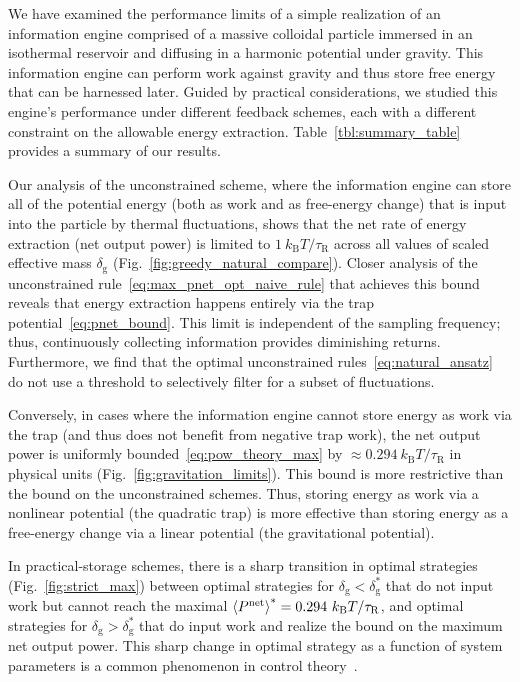 \documentclass[%
reprint,
bibnotes, amsmath, amssymb, aps, pre,
 showkeys,
floatfix
]{revtex4-2}
\newcommand{\kT}{k_{\mathrm{B}}T}
\newcommand{\mrm}{\mathrm}
\newcommand{\trelo}{\tau_{\mrm{R}}}
\newcommand{\dg}{\delta_{\mrm{g}}}
\newcommand{\epn}{\ev{P^{\mrm{net}}}}
\begin{document}
We have examined the performance limits of a simple realization of an information engine comprised of a massive colloidal particle immersed in an isothermal reservoir and diffusing in a harmonic potential under gravity. 
This information engine can perform work against gravity and thus store free energy that can be harnessed later.
Guided by practical considerations, we studied this engine's performance under different feedback schemes, each with a different constraint on the allowable energy extraction. 
Table~\ref{tbl:summary_table} provides a summary of our results.

Our analysis of the unconstrained scheme, where the information engine can store all of the potential energy (both as work and as free-energy change) that is input into the particle by thermal fluctuations, shows that the net rate of energy extraction (net output power) is limited to $1\ \kT/\trelo$ across all values of scaled effective mass $\dg$ (Fig.~\ref{fig:greedy_natural_compare}). 
Closer analysis of the unconstrained rule~\eqref{eq:max_pnet_opt_naive_rule} that achieves this bound reveals that energy extraction happens entirely via the trap potential~\eqref{eq:pnet_bound}. 
This limit is independent of the sampling frequency; thus, continuously collecting information provides diminishing returns.
Furthermore, we find that the optimal unconstrained rules~\eqref{eq:natural_ansatz} do not use a threshold to selectively filter for a subset of fluctuations.

Conversely, in cases where the information engine cannot store energy as work via the trap (and thus does not benefit from negative trap work), the net output power is uniformly bounded~\eqref{eq:pow_theory_max} by $\approx 0.294\ \kT/\trelo$ in physical units (Fig.~\ref{fig:gravitation_limits}).
This bound is more restrictive than the bound on the unconstrained schemes. 
Thus, storing energy as work via a nonlinear potential (the quadratic trap) is more effective than storing energy as a free-energy change via a linear potential (the gravitational potential).

In practical-storage schemes, there is a sharp transition in optimal strategies (Fig.~\ref{fig:strict_max}) between optimal strategies for $\dg < \dg^{*}$ that do not input work but cannot reach the maximal $\epn^{*} = 0.294\ \kT/\trelo$, and optimal strategies for $\dg > \dg^{*}$ that do input work and realize the bound on the maximum net output power. 
This sharp change in optimal strategy as a function of system parameters is a common phenomenon in control theory~\cite{bechhoefer_book2021,Solon2018}.
\end{document}
